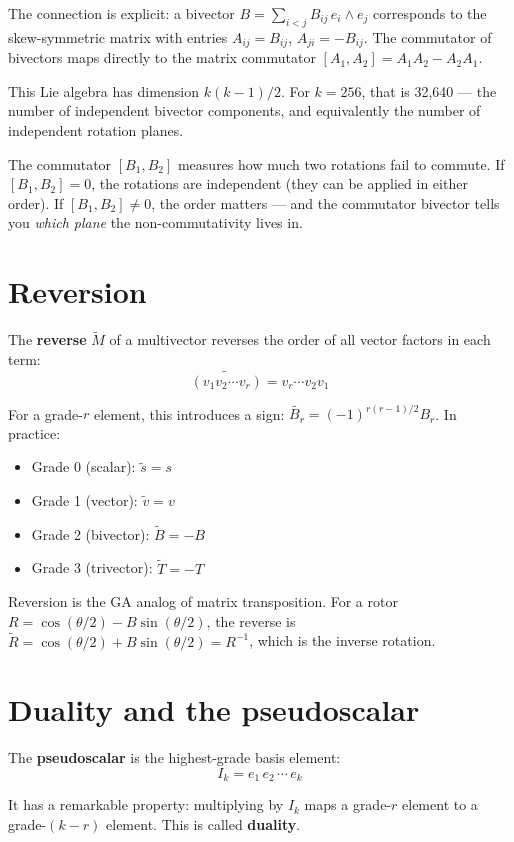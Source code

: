 \documentclass[11pt, twoside, openright]{memoir}
\newcommand{\op}{\wedge}          %
\newcommand{\rev}[1]{\widetilde{#1}} %
\begin{document}
The connection is explicit: a bivector
$B = \sum_{i < j} B_{ij} \, e_i \op e_j$
corresponds to the skew-symmetric matrix with entries $A_{ij} = B_{ij}$,
$A_{ji} = -B_{ij}$.  The commutator of bivectors maps directly to the
matrix commutator $[A_1, A_2] = A_1 A_2 - A_2 A_1$.

This Lie algebra has dimension $k(k-1)/2$.  For $k = 256$, that is
32,640 --- the number of independent bivector components, and
equivalently the number of independent rotation planes.

The commutator $[B_1, B_2]$ measures how much two rotations fail to
commute.  If $[B_1, B_2] = 0$, the rotations are independent (they can
be applied in either order).  If $[B_1, B_2] \neq 0$, the order matters
--- and the commutator bivector tells you \emph{which plane} the
non-commutativity lives in.

\section{Reversion}

The \textbf{reverse} $\rev{M}$ of a multivector reverses the order of
all vector factors in each term:
\[
  \rev{(v_1 v_2 \cdots v_r)} = v_r \cdots v_2 v_1
\]

For a grade-$r$ element, this introduces a sign: $\rev{B_r} = (-1)^{r(r-1)/2} B_r$.
In practice:
\begin{itemize}[nosep]
\item Grade 0 (scalar): $\rev{s} = s$
\item Grade 1 (vector): $\rev{v} = v$
\item Grade 2 (bivector): $\rev{B} = -B$
\item Grade 3 (trivector): $\rev{T} = -T$
\end{itemize}

Reversion is the GA analog of matrix transposition.  For a rotor
$R = \cos(\theta/2) - B\sin(\theta/2)$, the reverse is
$\rev{R} = \cos(\theta/2) + B\sin(\theta/2) = R^{-1}$, which is the
inverse rotation.

\section{Duality and the pseudoscalar}

The \textbf{pseudoscalar} is the highest-grade basis element:
\[
  I_k = e_1 \, e_2 \, \cdots \, e_k
\]

It has a remarkable property: multiplying by $I_k$ maps a grade-$r$
element to a grade-$(k-r)$ element.  This is called \textbf{duality}.
\end{document}
